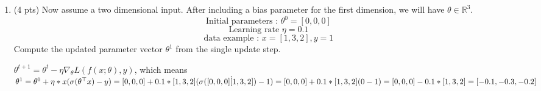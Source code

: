 \documentclass[a4paper]{article}
\theoremstyle{definition}
\newenvironment{soln}{
    \leavevmode\color{blue}\ignorespaces
}{}
\begin{document}
\begin{enumerate}
\begin{enumerate}
	\item (4 pts)
 Now assume a two dimensional input. After including a bias parameter for the first dimension, we will have $\theta\in\mathbb{R}^3$.
$$ \text{Initial parameters : }  \theta^{0}=[0, 0, 0]$$
$$ \text{Learning rate }\eta=0.1$$
$$ \text{data example : } x=[1, 3, 2], y=1$$
Compute the updated parameter vector $\theta^{1}$ from the single update step.
	
	\begin{soln}
            $ \theta^{t+1} = \theta^{t} - \eta \nabla_{\theta} L(f(x;\theta), y)$, which means
            \\$\theta^{1} = \theta^{0} + \eta * x(\sigma(\theta^\top x) - y)
            \\ = [0,0,0] + 0.1 * [1,3,2] (\sigma([0,0,0] \dot [1,3,2]) - 1)
            \\ = [0,0,0] + 0.1 * [1,3,2] (0 - 1)
            \\ = [0,0,0] - 0.1 * [1,3,2]
            \\ = [-0.1, -0.3, -0.2]
            $
        \end{soln}
\end{enumerate}
\end{enumerate}
\end{document}
